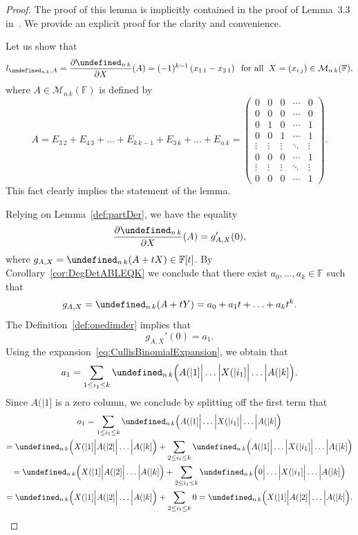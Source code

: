 \documentclass{elsarticle}
\let\det\undefined
\DeclareMathOperator{\det}{det}
\def\F{{\mathbb F}}
\def\M{{\mathcal M}}
\theoremstyle{definition}
\numberwithin{equation}{section}
\begin{document}
\begin{proof}The proof of this lemma is implicitly contained in the proof of Lemma~3.3 in~\cite{Guterman2025b}. We provide an explicit proof for the clarity and convenience.

Let us show that
\begin{equation}\label{lem:NKOdd11InL:eq5}
l_{\det_{n\,k}, A} = \frac{\partial \det_{n\,k}}{\partial X}(A) = (-1)^{k-1}\left(x_{1\,1} - x_{2\,1}\right)\;\;\mbox{for all}\;\; X = (x_{i\,j}) \in \M_{n\,k}(\F),
\end{equation}
where $A \in \M_{n\, k}(\F)$ is defined by
\[
A = E_{3\,2} + E_{4\,3} + \ldots + E_{k\, k-1} + E_{3\, k} + \ldots + E_{n\, k}  = \begin{pmatrix}
0 & 0 & 0 & \cdots & 0\\
0 & 0 & 0 & \cdots & 0\\
0 & 1 & 0 &\cdots & 1\\
0 & 0 & 1 &\cdots & 1\\
\vdots & \vdots & \vdots & \ddots & \vdots\\
0 & 0 & 0 & \cdots & 1\\
\vdots & \vdots & \vdots & \ddots & \vdots\\
0 & 0 & 0 & \cdots & 1
\end{pmatrix}.
\]
This fact clearly implies the statement of the lemma.

Relying on Lemma~\ref{def:partDer}, we have the equality 
\begin{equation}\label{lem:NKOdd11InL:eq2}
\frac{\partial \det_{n\,k}}{\partial X}(A) = g_{A, X}'(0),
\end{equation}
where $g_{A, X} = \det_{n\,k}(A + tX) \in \F[t]$. By Corollary~\ref{cor:DegDetABLEQK} we conclude that there exist $a_0, \ldots, a_k \in \F$ such that
 \[ g_{A, X} = \det_{n\, k} (A + t Y) = a_0 + a_1t + \ldots + a_k t^k.
  \]
The Definition~\ref{def:onedimder} implies that 
\begin{equation}\label{lem:NKOdd11InL:eq1}
g_{A, X}'(0) = a_1.
\end{equation}
Using the expansion~\eqref{eq:CullisBinomialExpansion}, we obtain that
\[
a_1 = \sum_{1 \le i_1 \le k} \det_{n\,k}\Bigl(A(|1]\Big|\ldots \Big| X(|i_1] \Big| \ldots \Big| A(|k] \Bigr).
\]
Since $A(|1]$ is a zero column, we conclude by splitting off the first term that
\begin{multline}\label{lem:NKOdd11InL:eq3}
a_1 = \sum_{1 \le i_1 \le k} \det_{n\,k}\Bigl(A(|1]\Big|\ldots \Big| X(|i_1] \Big| \ldots \Big| A(|k] \Bigr)\\
 = \det_{n\,k} \Bigl(X(|1] \Big| A(|2] \Big| \ldots \Big| A(|k]\Bigr)  + \sum_{2 \le i_1 \le k} \det_{n\,k}\Bigl(A(|1]\Big|\ldots \Big| X(|i_1] \Big| \ldots \Big| A(|k] \Bigr)\\
 = \det_{n\,k} \Bigl(X(|1] \Big| A(|2] \Big| \ldots \Big| A(|k]\Bigr)  + \sum_{2 \le i_1 \le k} \det_{n\,k}\Bigl(0\Big|\ldots \Big| X(|i_1] \Big| \ldots \Big| A(|k] \Bigr)\\
 =  \det_{n\,k} \Bigl(X(|1] \Big| A(|2] \Big| \ldots \Big| A(|k]\Bigr) + \sum_{2 \le i_1 \le k} 0
 = \det_{n\,k} \Bigl(X(|1] \Big| A(|2] \Big| \ldots \Big| A(|k]\Bigr).
\end{multline}


\end{proof}
\end{document}
